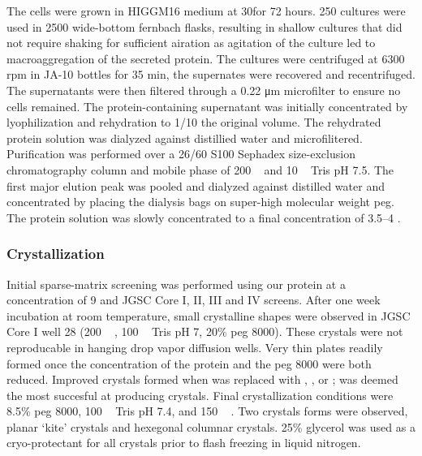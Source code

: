 The cells were grown in HIGGM16 medium  %
at 30\cel for 72 hours. 250 \millilitre cultures
were used in 2500 \millilitre wide-bottom fernbach flasks, resulting in shallow
cultures that did not require shaking for sufficient airation as
agitation of the culture led to macroaggregation of the secreted
protein. The cultures were centrifuged at 6300 rpm in JA-10 bottles for
35 min, the supernates were recovered and recentrifuged. The
supernatants were then filtered through a 0.22 \si{\micro\meter} microfilter to ensure
no cells remained. The protein-containing supernatant was initially
concentrated by lyophilization and rehydration to 1/10 the original
volume. The rehydrated protein solution was dialyzed against distillied
water and microfilitered. Purification was performed over a 26/60 S100
Sephadex size-exclusion chromatography column and mobile phase of 200 \si{\milli\molar}  and 10 \si{\milli\molar}
Tris pH 7.5. The first major elution peak was pooled and dialyzed
against distilled water and concentrated by placing the dialysis bags on
super-high molecular weight \ac{peg}. The protein
solution was slowly concentrated to a final concentration of 3.5--4
\mgperml.

\subsubsection{Crystallization}\label{crystallization}

Initial sparse-matrix screening was performed using our protein at a
concentration of 9 \mgperml and JGSC Core I, II, III and IV screens. %
 After one week incubation at room temperature, small crystalline shapes were
observed in JGSC Core I well 28 (200 \si{\milli\molar}  , 100 \si{\milli\molar} Tris pH 7, 20\% \ac{peg}
8000). These crystals were not reproducable in hanging drop vapor
diffusion wells. Very thin plates readily formed once the concentration
of the protein and the \ac{peg} 8000 were both reduced. Improved crystals
formed when  was replaced with , , or ;  was
deemed the most succesful at producing crystals. Final crystallization
conditions were 8.5\% \ac{peg} 8000, 100 \si{\milli\molar} Tris pH 7.4, and 150 \si{\milli\molar} .
Two crystals forms were observed, planar `kite' crystals and hexegonal
columnar crystals. 25\% glycerol was used as a cryo-protectant for all
crystals prior to flash freezing in liquid nitrogen.